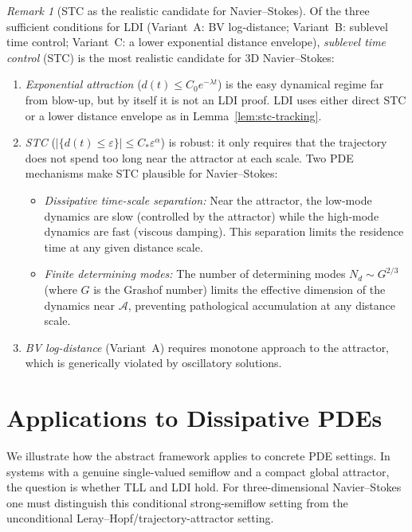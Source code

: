 \documentclass[12pt,a4paper]{article}
\theoremstyle{definition}
\theoremstyle{plain}
\theoremstyle{remark}
\newtheorem{remark}[definition]{Remark}
\begin{document}
\begin{remark}[STC as the realistic candidate for Navier--Stokes]
\label{rem:stc-realistic}
Of the three sufficient conditions for LDI (Variant~A: BV log-distance; Variant~B: sublevel time control; Variant~C: a lower exponential distance envelope), \emph{sublevel time control} (STC) is the most realistic candidate for 3D Navier--Stokes:
\begin{enumerate}
\item \emph{Exponential attraction} ($d(t) \leq C_0 e^{-\lambda t}$) is the easy dynamical regime far from blow-up, but by itself it is not an LDI proof.  LDI uses either direct STC or a lower distance envelope as in Lemma~\ref{lem:stc-tracking}.
\item \emph{STC} ($|\{d(t) \leq \varepsilon\}| \leq C_* \varepsilon^\alpha$) is robust: it only requires that the trajectory does not spend too long near the attractor at each scale. Two PDE mechanisms make STC plausible for Navier--Stokes:
\begin{itemize}
\item \emph{Dissipative time-scale separation:} Near the attractor, the low-mode dynamics are slow (controlled by the attractor) while the high-mode dynamics are fast (viscous damping). This separation limits the residence time at any given distance scale.
\item \emph{Finite determining modes:} The number of determining modes $N_d \sim G^{2/3}$ (where $G$ is the Grashof number) limits the effective dimension of the dynamics near $\mathcal{A}$, preventing pathological accumulation at any distance scale.
\end{itemize}
\item \emph{BV log-distance} (Variant~A) requires monotone approach to the attractor, which is generically violated by oscillatory solutions.
\end{enumerate}
\end{remark}


\section{Applications to Dissipative PDEs}
\label{sec:applications}

We illustrate how the abstract framework applies to concrete
PDE settings.  In systems with a genuine single-valued semiflow and
a compact global attractor, the question is whether TLL and LDI
hold.  For three-dimensional Navier--Stokes one must distinguish
this conditional strong-semiflow setting from the unconditional
Leray--Hopf/trajectory-attractor setting.
\end{document}

